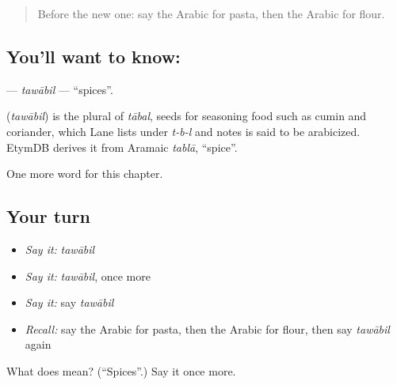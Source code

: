 \begin{quote}
Before the new one: say the Arabic for pasta, then the Arabic for flour.
\end{quote}

\subsection*{You'll want to know: }
\textbf{} — \emph{tawābil} — \textquotedblleft{}spices\textquotedblright{}.

\begin{cousinweb}
\textbf{} (\emph{tawābil}) is the plural of \emph{tābal}, seeds for seasoning food such as cumin and coriander, which Lane lists under \emph{t-b-l} and notes is said to be arabicized. EtymDB derives it from Aramaic \emph{tablā}, \textquotedblleft{}spice\textquotedblright{}.
\end{cousinweb}

\begin{grammarlens}[title={What you've built}]
One more word for this chapter.
\end{grammarlens}

\subsection*{Your turn}
\begin{itemize}
\raggedright
  \item \emph{Say it:} \emph{tawābil}
  \item \emph{Say it:} \emph{tawābil}, once more
  \item \emph{Say it:} say \emph{tawābil}
  \item \emph{Recall:} say the Arabic for pasta, then the Arabic for flour, then say \emph{tawābil} again
\end{itemize}

\begin{tcolorbox}[breakable,colback=teal!4,colframe=teal!35!black,title={Before you move on}]
What does  mean? (\textquotedblleft{}Spices\textquotedblright{}.) Say it once more.
\end{tcolorbox}
